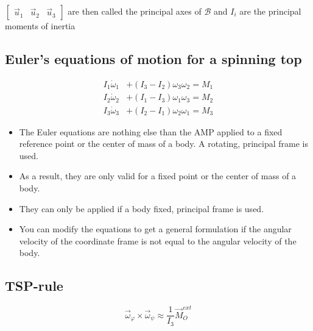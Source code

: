 \documentclass[10pt,a4paper]{scrartcl}
\begin{document}
\begin{multicols*}{2}
$\begin{bmatrix}\vec{u}_1&\vec{u}_2&\vec{u}_3\end{bmatrix}$ are then called the principal axes of $\mathcal{B}$ and $I_i$ are the principal moments of inertia


\subsection{Euler's equations of motion for a spinning top}

\begin{equation*}
\begin{aligned}
I_1\dot{\omega}_1&+(I_3-I_2)\omega_3\omega_2=M_1\\
I_2\dot{\omega}_2&+(I_1-I_3)\omega_1\omega_3=M_2\\
I_3\dot{\omega}_3&+(I_2-I_1)\omega_2\omega_1=M_3
\end{aligned}
\end{equation*}


\begin{itemize}
\item The Euler equations are nothing else than the AMP applied to a fixed reference point or the center of mass of a body. A rotating, principal frame is used.
\item As a result, they are only valid for a fixed point or the center of mass of a body.
\item They can only be applied if a body fixed, principal frame is used.
\item You can modify the equations to get a general formulation if the angular velocity of the coordinate frame is not equal to the angular velocity of the body.
\end{itemize}

\subsection{TSP-rule}

\begin{equation*}
\vec{\omega}_\varphi\times\vec{\omega}_\psi\approx\frac{1}{I_3}\vec{M}_O^{ext}
\end{equation*}


\end{multicols*}
\end{document}
